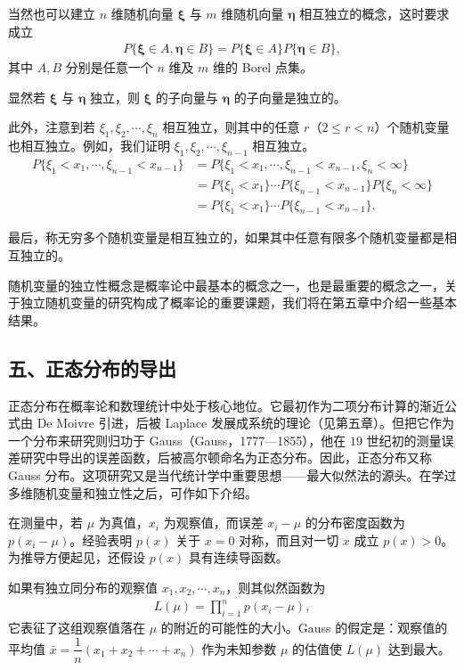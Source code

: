 \documentclass[../../main.tex]{subfiles}
\begin{document}
当然也可以建立 $n$ 维随机向量 $\boldsymbol{\xi}$ 与 $m$ 维随机向量 $\boldsymbol{\eta}$ 相互独立的概念，这时要求成立
\begin{align*}P\{\boldsymbol{\xi}\in A,\boldsymbol{\eta}\in B\}=P\{\boldsymbol{\xi}\in A\}P\{\boldsymbol{\eta}\in B\},\end{align*}
其中 $A,B$ 分别是任意一个 $n$ 维及 $m$ 维的 Borel 点集。

显然若 $\boldsymbol{\xi}$ 与 $\boldsymbol{\eta}$ 独立，则 $\boldsymbol{\xi}$ 的子向量与 $\boldsymbol{\eta}$ 的子向量是独立的。

此外，注意到若 $\xi_1,\xi_2,\cdots,\xi_n$ 相互独立，则其中的任意 $r$（$2\leqslant r<n$）个随机变量也相互独立。例如，我们证明 $\xi_1,\xi_2,\cdots,\xi_{n-1}$ 相互独立。
\begin{align*}
P\{\xi_1<x_1,\cdots,\xi_{n-1}<x_{n-1}\}
&=P\{\xi_1<x_1,\cdots,\xi_{n-1}<x_{n-1},\xi_n<\infty\}\\
&=P\{\xi_1<x_1\}\cdots P\{\xi_{n-1}<x_{n-1}\}P\{\xi_n<\infty\}\\
&=P\{\xi_1<x_1\}\cdots P\{\xi_{n-1}<x_{n-1}\}.
\end{align*}

最后，称无穷多个随机变量是相互独立的，如果其中任意有限多个随机变量都是相互独立的。

随机变量的独立性概念是概率论中最基本的概念之一，也是最重要的概念之一，关于独立随机变量的研究构成了概率论的重要课题，我们将在第五章中介绍一些基本结果。

\subsection*{五、正态分布的导出}

正态分布在概率论和数理统计中处于核心地位。它最初作为二项分布计算的渐近公式由 De Moivre 引进，后被 Laplace 发展成系统的理论（见第五章）。但把它作为一个分布来研究则归功于 Gauss（Gauss，1777—1855），他在 $19$ 世纪初的测量误差研究中导出的误差函数，后被高尔顿命名为正态分布。因此，正态分布又称 Gauss 分布。这项研究又是当代统计学中重要思想——最大似然法的源头。在学过多维随机变量和独立性之后，可作如下介绍。

在测量中，若 $\mu$ 为真值，$x_i$ 为观察值，而误差 $x_i-\mu$ 的分布密度函数为 $p(x_i-\mu)$。经验表明 $p(x)$ 关于 $x=0$ 对称，而且对一切 $x$ 成立 $p(x)>0$。为推导方便起见，还假设 $p(x)$ 具有连续导函数。

如果有独立同分布的观察值 $x_1,x_2,\cdots,x_n$，则其似然函数为
\begin{align*}L(\mu)=\prod_{i=1}^{n}p(x_i-\mu),\end{align*}
它表征了这组观察值落在 $\mu$ 的附近的可能性的大小。Gauss 的假定是：观察值的平均值 $\bar{x}=\dfrac{1}{n}(x_1+x_2+\cdots+x_n)$ 作为未知参数 $\mu$ 的估值使 $L(\mu)$ 达到最大。
\end{document}
